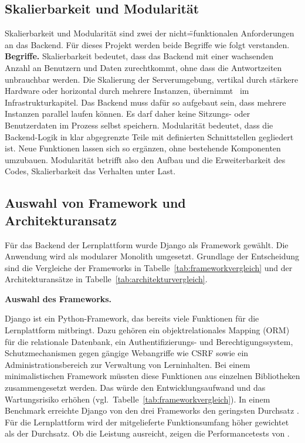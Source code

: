 \subsection{Skalierbarkeit und Modularität}
\label{sec:skalierbarkeit-modularitaet}
Skalierbarkeit und Modularität sind zwei der nicht\"=funktionalen Anforderungen an das Backend. Für dieses Projekt werden beide Begriffe wie folgt verstanden.
\textbf{Begriffe.}
Skalierbarkeit bedeutet, dass das Backend mit einer wachsenden Anzahl an Benutzern und Daten zurechtkommt, ohne dass die Antwortzeiten unbrauchbar werden.
Die Skalierung der Serverumgebung, vertikal durch stärkere Hardware oder horizontal durch mehrere Instanzen, übernimmt \Jai\ im Infrastrukturkapitel.
Das Backend muss dafür so aufgebaut sein, dass mehrere Instanzen parallel laufen können. Es darf daher keine Sitzungs- oder Benutzerdaten im Prozess selbst speichern.
Modularität bedeutet, dass die Backend-Logik in klar abgegrenzte Teile mit definierten Schnittstellen gegliedert ist.
Neue Funktionen lassen sich so ergänzen, ohne bestehende Komponenten umzubauen.
Modularität betrifft also den Aufbau und die Erweiterbarkeit des Codes, Skalierbarkeit das Verhalten unter Last.


\subsection{Auswahl von Framework und Architekturansatz}
\label{subsec:auswahl-framework-architektur}

Für das Backend der Lernplattform wurde Django als Framework gewählt. Die Anwendung wird als modularer Monolith umgesetzt. Grundlage der Entscheidung sind die Vergleiche der Frameworks in Tabelle~\ref{tab:frameworkvergleich} und der Architekturansätze in Tabelle~\ref{tab:architekturvergleich}.

\textbf{Auswahl des Frameworks.}

Django ist ein Python-Framework, das bereits viele Funktionen für die Lernplattform mitbringt. Dazu gehören ein objektrelationales Mapping (ORM) für die relationale Datenbank, ein Authentifizierungs- und Berechtigungssystem, Schutzmechanismen gegen gängige Webangriffe wie CSRF sowie ein Administrationsbereich zur Verwaltung von Lerninhalten. Bei einem minimalistischen Framework müssten diese Funktionen aus einzelnen Bibliotheken zusammengesetzt werden. Das würde den Entwicklungsaufwand und das Wartungsrisiko erhöhen (vgl.~Tabelle~\ref{tab:frameworkvergleich}).
In einem Benchmark erreichte Django von den drei Frameworks den geringsten Durchsatz \parencite{bednarz2025}. Für die Lernplattform wird der mitgelieferte Funktionsumfang höher gewichtet als der Durchsatz. Ob die Leistung ausreicht, zeigen die Performancetests von \Jai.

